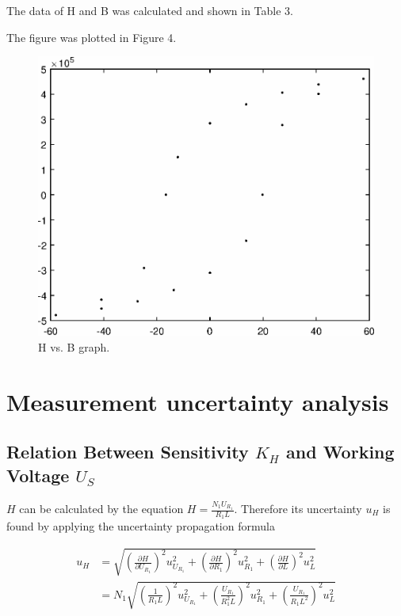 \documentclass{article}
\begin{document}
\newpage

The data of H and B was calculated and shown in Table 3.



The figure was plotted in Figure 4.

\begin{figure}[H]
	\centering
	\includegraphics[scale=0.6]{fig.eps}
	\caption{H vs. B graph.}
\end{figure}

\section{Measurement uncertainty analysis}

\subsection{Relation Between Sensitivity $ K_H $ and Working Voltage $ U_S $}

$H$ can be calculated by the equation $H=\frac{N_1U_{R_1}}{R_1L}$. Therefore its uncertainty $u_{H}$ is found by applying the uncertainty propagation formula

\begin{align*}
u_{H}&=\sqrt{\left(\frac{\partial H}{\partial U_{R_1}}\right)^2u_{U_{R_1}}^2+\left(\frac{\partial H}{\partial R_1}\right)^2u_{R_1}^2+\left(\frac{\partial H}{\partial  L}\right)^2u_L^2}\\
&=N_1\sqrt{\left(\frac{1}{R_1L}\right)^2u_{U_{R_1}}^2+\left(\frac{U_{R_1}}{R_1^2L}\right)^2u_{R_1}^2+\left(\frac{U_{R_1}}{R_1L^2}\right)^2u_{L}^2}\\
\end{align*}
\end{document}
